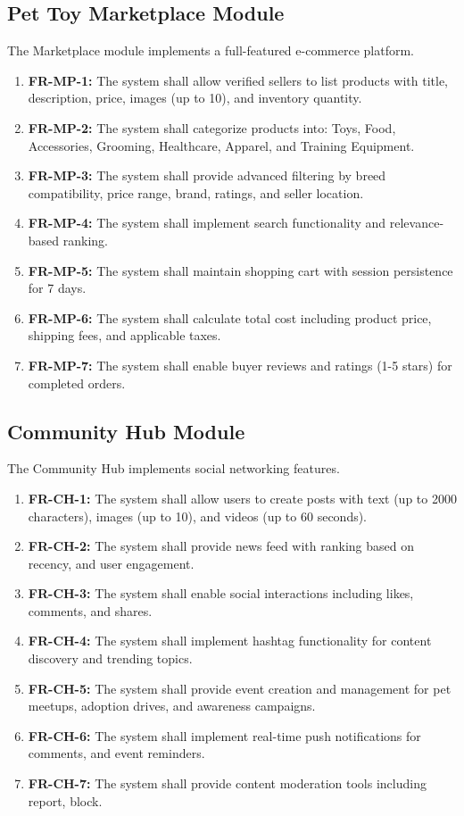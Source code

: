 \subsection{Pet Toy Marketplace Module}
The Marketplace module implements a full-featured e-commerce platform.

\begin{enumerate}
    \item \textbf{FR-MP-1:} The system shall allow verified sellers to list products with title, description, price, images (up to 10), and inventory quantity.
    \item \textbf{FR-MP-2:} The system shall categorize products into: Toys, Food, Accessories, Grooming, Healthcare, Apparel, and Training Equipment.
    \item \textbf{FR-MP-3:} The system shall provide advanced filtering by breed compatibility, price range, brand, ratings, and seller location.
    \item \textbf{FR-MP-4:} The system shall implement search functionality and  relevance-based ranking.
    \item \textbf{FR-MP-5:} The system shall maintain shopping cart with session persistence for 7 days.
    \item \textbf{FR-MP-6:} The system shall calculate total cost including product price, shipping fees, and applicable taxes.
    \item \textbf{FR-MP-7:} The system shall enable buyer reviews and ratings (1-5 stars) for completed orders.
\end{enumerate}

\subsection{Community Hub Module}
The Community Hub implements social networking features.

\begin{enumerate}
    \item \textbf{FR-CH-1:} The system shall allow users to create posts with text (up to 2000 characters), images (up to 10), and videos (up to 60 seconds).
    \item \textbf{FR-CH-2:} The system shall provide news feed with ranking based on recency, and user engagement.
    \item \textbf{FR-CH-3:} The system shall enable social interactions including likes, comments, and shares.
    \item \textbf{FR-CH-4:} The system shall implement hashtag functionality for content discovery and trending topics.
    \item \textbf{FR-CH-5:} The system shall provide event creation and management for pet meetups, adoption drives, and awareness campaigns.
    \item \textbf{FR-CH-6:} The system shall implement real-time push notifications for  comments, and event reminders.
    \item \textbf{FR-CH-7:} The system shall provide content moderation tools including report, block.
\end{enumerate}

